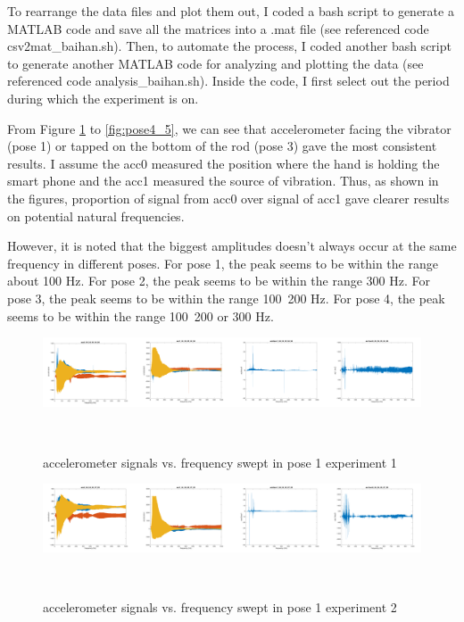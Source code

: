 \documentclass{sigchi}
\begin{document}
To rearrange the data files and plot them out, I coded a bash script to generate a MATLAB code and save all the matrices into a .mat file (see referenced code csv2mat\_baihan.sh). Then, to automate the process, I coded another bash script to generate another MATLAB code for analyzing and plotting the data (see referenced code analysis\_baihan.sh). Inside the code, I first select out the period during which the experiment is on.

From Figure \ref{fig:pose1_1} to \ref{fig:pose4_5}, we can see that accelerometer facing the vibrator (pose 1) or tapped on the bottom of the rod (pose 3) gave the most consistent results. I assume the acc0 measured the position where the hand is holding the smart phone and the acc1 measured the source of vibration. Thus, as shown in the figures, proportion of signal from acc0 over signal of acc1 gave clearer results on potential natural frequencies.

However, it is noted that the biggest amplitudes doesn't always occur at the same frequency in different poses. For pose 1, the peak seems to be within the range about 100 Hz. For pose 2, the peak seems to be within the range 300 Hz. For pose 3, the peak seems to be within the range 100~200 Hz. For pose 4, the peak seems to be within the range 100~200 or 300 Hz.

\begin{figure}
  \centering
  \includegraphics[width=1.95\columnwidth]{figures/pose1_1}
  \caption{accelerometer signals vs. frequency swept in pose 1 experiment 1}
    ~\label{fig:pose1_1}
\end{figure}

\begin{figure}
  \centering
  \includegraphics[width=1.95\columnwidth]{figures/pose1_2}
  \caption{accelerometer signals vs. frequency swept in pose 1 experiment 2}
    ~\label{fig:pose1_2}
\end{figure}
\end{document}

